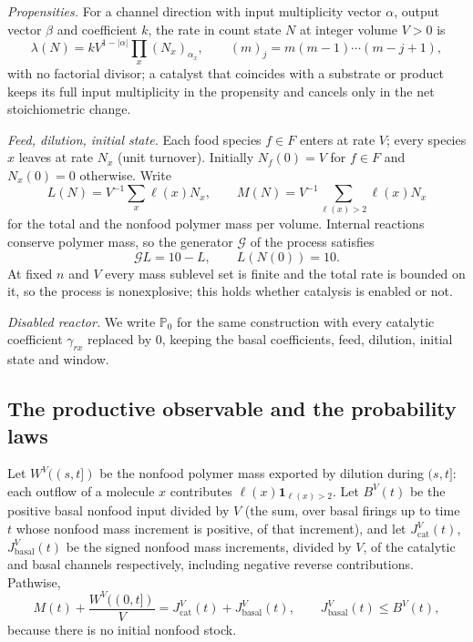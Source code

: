 \documentclass[11pt,letterpaper]{article}
\theoremstyle{plain}
\theoremstyle{definition}
\theoremstyle{remark}
\numberwithin{equation}{section}
\newcommand{\PP}{\mathbb P}
\newcommand{\cG}{\mathcal G}
\newcommand{\ind}{\mathbf 1}
\newcommand{\cat}{\mathrm{cat}}
\newcommand{\bas}{\mathrm{basal}}
\begin{document}
\emph{Propensities.} For a channel direction with input multiplicity vector $\alpha$, output vector $\beta$ and coefficient $k$, the rate in count state $N$ at integer volume $V>0$ is
\begin{equation}\label{eq:propensity}
 \lambda(N)=kV^{1-|\alpha|}\prod_x(N_x)_{\alpha_x},\qquad (m)_j=m(m-1)\cdots(m-j+1),
\end{equation}
with no factorial divisor; a catalyst that coincides with a substrate or product keeps its full input multiplicity in the propensity and cancels only in the net stoichiometric change.

\emph{Feed, dilution, initial state.} Each food species $f\in F$ enters at rate $V$; every species $x$ leaves at rate $N_x$ (unit turnover). Initially $N_f(0)=V$ for $f\in F$ and $N_x(0)=0$ otherwise. Write
\begin{equation}\label{eq:LM}
 L(N)=V^{-1}\sum_x\ell(x)N_x,\qquad M(N)=V^{-1}\sum_{\ell(x)>2}\ell(x)N_x
\end{equation}
for the total and the nonfood polymer mass per volume. Internal reactions conserve polymer mass, so the generator $\cG$ of the process satisfies
\begin{equation}\label{eq:mass}
 \cG L=10-L,\qquad L(N(0))=10 .
\end{equation}
At fixed $n$ and $V$ every mass sublevel set is finite and the total rate is bounded on it, so the process is nonexplosive; this holds whether catalysis is enabled or not.

\emph{Disabled reactor.} We write $\PP_0$ for the same construction with every catalytic coefficient $\gamma_{rx}$ replaced by $0$, keeping the basal coefficients, feed, dilution, initial state and window.

\subsection{The productive observable and the probability laws}\label{sec:observable}
Let $W^V((s,t])$ be the nonfood polymer mass exported by dilution during $(s,t]$: each outflow of a molecule $x$ contributes $\ell(x)\ind_{\ell(x)>2}$. Let $B^V(t)$ be the positive basal nonfood input divided by $V$ (the sum, over basal firings up to time $t$ whose nonfood mass increment is positive, of that increment), and let $J^V_\cat(t)$, $J^V_\bas(t)$ be the signed nonfood mass increments, divided by $V$, of the catalytic and basal channels respectively, including negative reverse contributions. Pathwise,
\begin{equation}\label{eq:balance}
 M(t)+\frac{W^V((0,t])}V=J^V_\cat(t)+J^V_\bas(t),\qquad J^V_\bas(t)\le B^V(t),
\end{equation}
because there is no initial nonfood stock.
\end{document}
